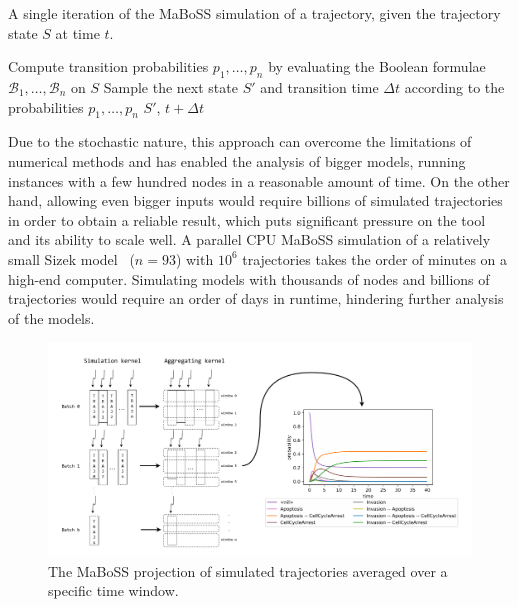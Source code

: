 \begin{algorithm}
    \caption{A single iteration of the MaBoSS simulation of a trajectory, given the trajectory state $S$ at time $t$.}
    \label{alg:iter}
    \begin{algorithmic}[1]
    \State Compute transition probabilities $p_1, \dots, p_n$ by evaluating the Boolean formulae $\mathcal{B}_1, \dots, \mathcal{B}_n$ on $S$
    \State Sample the next state $S'$ and transition time $\Delta t$ according to the probabilities $p_1, \dots, p_n$
    \State \Return $S'$, $t + \Delta t$
    \EndProcedure
    \end{algorithmic}
\end{algorithm}

Due to the stochastic nature, this approach can overcome the limitations of numerical methods and has enabled the analysis of bigger models, running instances with a few hundred nodes in a reasonable amount of time. On the other hand, allowing even bigger inputs would require billions of simulated trajectories in order to obtain a reliable result, which puts significant pressure on the tool and its ability to scale well. A parallel CPU MaBoSS simulation of a relatively small Sizek model~\cite{sizek2019boolean} ($n=93$) with $10^6$ trajectories takes the order of minutes on a high-end computer. Simulating models with thousands of nodes and billions of trajectories would require an order of days in runtime, hindering further analysis of the models.

\begin{figure}
    \centering
    \includegraphics[width=\textwidth]{img/mabossg-kernels.drawio.pdf}
    \caption{The MaBoSS projection of simulated trajectories averaged over a specific time window.}
    \label{fig:maboss}
\end{figure}

